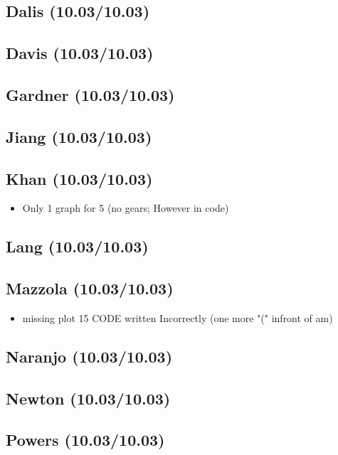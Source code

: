 \documentclass[11pt]{article}
\begin{document}
\subsection{Dalis (10.03/10.03)}
\label{sec:orgheadline6}
\subsection{Davis (10.03/10.03)}
\label{sec:orgheadline7}
\subsection{Gardner (10.03/10.03)}
\label{sec:orgheadline8}
\subsection{Jiang (10.03/10.03)}
\label{sec:orgheadline9}
\subsection{Khan (10.03/10.03)}
\label{sec:orgheadline10}
\begin{itemize}
\item Only 1 graph for 5 (no gears; However in code)
\end{itemize}
\subsection{Lang (10.03/10.03)}
\label{sec:orgheadline11}
\subsection{Mazzola (10.03/10.03)}
\label{sec:orgheadline12}
\begin{itemize}
\item missing plot 15 CODE written Incorrectly (one more "(" infront of am)
\end{itemize}
\subsection{Naranjo (10.03/10.03)}
\label{sec:orgheadline13}
\subsection{Newton (10.03/10.03)}
\label{sec:orgheadline14}
\subsection{Powers (10.03/10.03)}
\label{sec:orgheadline15}
\end{document}
